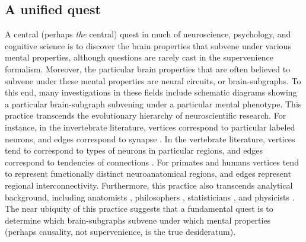 \documentclass{article}
\newcommand{\mB}{\mathcal{B}}
\begin{document}








\subsection{A unified quest} %
\label{sub:practical_applications}

A central (perhaps \emph{the} central) quest in much of neuroscience, psychology, and cognitive science is to discover the brain properties that subvene under various mental properties, although questions are rarely cast in the supervenience formalism.  Moreover, the particular brain properties that are often believed to subvene under these mental properties are neural circuits, or brain-subgraphs.  To this end, many investigations in these fields include schematic diagrams showing a particular brain-subgraph subvening under a particular mental phenotype. This practice transcends the evolutionary hierarchy of neuroscientific research.  For instance, in the invertebrate literature, vertices correspond to particular labeled neurons, and edges correspond to synapse \cite{NorthGreenspan07}.  In the vertebrate literature, vertices tend to correspond to types of neurons in particular regions, and edges correspond to tendencies of connections \cite{Shepherd04}.  For primates \cite{Felleman_VanEssen91} and humans \cite{Mori05} vertices tend to represent functionally distinct neuroanatomical regions, and edges represent regional interconnectivity. Furthermore, this practice also transcends analytical background, including anatomists \cite{Abeles91}, philosophers \cite{Koch_Davis94}, statisticians \cite{Rao_Lewicki02}, and physicists \cite{Chow_Dalibard03}.  The near ubiquity of this practice suggests that a fundamental quest is to determine which brain-subgraphs subvene under which mental properties (perhaps causality, not supervenience, is the true desideratum).  
\end{document}

